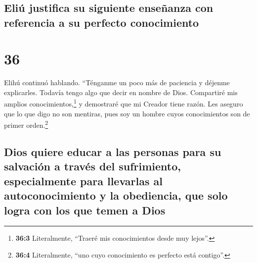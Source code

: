 \hypertarget{eliuxfa-justifica-su-siguiente-enseuxf1anza-con-referencia-a-su-perfecto-conocimiento}{%
\subsection{Eliú justifica su siguiente enseñanza con referencia a su
perfecto
conocimiento}\label{eliuxfa-justifica-su-siguiente-enseuxf1anza-con-referencia-a-su-perfecto-conocimiento}}

\hypertarget{section-35}{%
\section{36}\label{section-35}}

 Elihú continuó hablando.  ``Ténganme un
poco más de paciencia y déjenme explicarles. Todavía tengo algo que
decir en nombre de Dios.  Compartiré mis amplios
conocimientos,\footnote{\textbf{36:3} Literalmente, ``Traeré mis
  conocimientos desde muy lejos''.} y demostraré que mi Creador tiene
razón.  Les aseguro que lo que digo no son mentiras, pues
soy un hombre cuyos conocimientos son de primer orden.\footnote{\textbf{36:4}
  Literalmente, ``uno cuyo conocimiento es perfecto está contigo''.}

\hypertarget{dios-quiere-educar-a-las-personas-para-su-salvaciuxf3n-a-travuxe9s-del-sufrimiento-especialmente-para-llevarlas-al-autoconocimiento-y-la-obediencia-que-solo-logra-con-los-que-temen-a-dios}{%
\subsection{Dios quiere educar a las personas para su salvación a través
del sufrimiento, especialmente para llevarlas al autoconocimiento y la
obediencia, que solo logra con los que temen a
Dios}\label{dios-quiere-educar-a-las-personas-para-su-salvaciuxf3n-a-travuxe9s-del-sufrimiento-especialmente-para-llevarlas-al-autoconocimiento-y-la-obediencia-que-solo-logra-con-los-que-temen-a-dios}}


